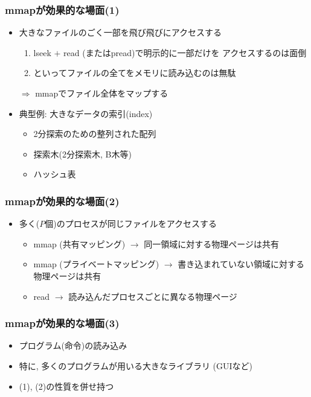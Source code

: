 \documentclass[12pt,dvipdfmx]{beamer}
\begin{document}
\begin{frame}
  \frametitle{mmapが効果的な場面(1)}
  \begin{itemize}
  \item 大きなファイルのごく一部を飛び飛びにアクセスする
    \begin{enumerate}
    \item lseek $+$ read (またはpread)で明示的に一部だけを
      アクセスするのは面倒
    \item といってファイルの全てをメモリに読み込むのは無駄
    \end{enumerate}
    $\Rightarrow$ mmapでファイル全体をマップする
    
  \item 典型例: 大きなデータの索引(index)
    \begin{itemize}
    \item 2分探索のための整列された配列
    \item 探索木(2分探索木, B木等)
    \item ハッシュ表
    \end{itemize}
  \end{itemize}
\end{frame}


\begin{frame}
  \frametitle{mmapが効果的な場面(2)}
  \begin{itemize}
  \item 多く($P$個)のプロセスが同じファイルをアクセスする
    \begin{itemize}
    \item mmap (共有マッピング) $\rightarrow$ 同一領域に対する物理ページは共有
    \item mmap (プライベートマッピング)
      $\rightarrow$ 書き込まれていない領域に対する物理ページは共有
    \item read $\rightarrow$ 読み込んだプロセスごとに異なる物理ページ
    \end{itemize}
  \end{itemize}
\end{frame}

\begin{frame}
  \frametitle{mmapが効果的な場面(3)}
  \begin{itemize}
  \item プログラム(命令)の読み込み
  \item 特に, 多くのプログラムが用いる大きなライブラリ (GUIなど)
  \item (1), (2)の性質を併せ持つ
  \end{itemize}
\end{frame}
\end{document}
